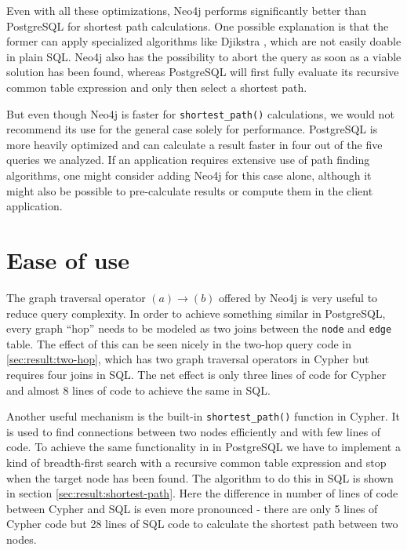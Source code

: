 \documentclass[11pt, a4paper,oneside,chapterprefix=false]{scrbook}
\begin{document}
Even with all these optimizations, Neo4j performs significantly better than PostgreSQL for shortest path calculations.
One possible explanation is that the former can apply specialized algorithms like Djikstra \cite{dijkstra}, which are not easily doable in plain SQL. Neo4j also has the possibility to abort the query as soon as a viable solution has been found, whereas PostgreSQL will first fully evaluate its recursive common table expression and only then select a shortest path.

But even though Neo4j is faster for \lstinline{shortest_path()} calculations, we would not recommend its use for the general case solely for performance. 
PostgreSQL is more heavily optimized and can calculate a result faster in four out of the five queries we analyzed. 
If an application requires extensive use of path finding algorithms, one might consider adding Neo4j for this case alone, although it might also be possible to pre-calculate results or compute them in the client application.

\section{Ease of use} \label{sec:convenience}

The graph traversal operator $(a) \rightarrow (b)$ offered by Neo4j is very useful to reduce query complexity.
In order to achieve something similar in PostgreSQL, every graph ``hop'' needs to be modeled as two joins between the \lstinline{node} and \lstinline{edge} table.
The effect of this can be seen nicely in the two-hop query code in \ref{sec:result:two-hop}, which has two graph traversal operators in Cypher but requires four joins in SQL. The net effect is only three lines of code for Cypher and almost 8 lines of code to achieve the same in SQL.

Another useful mechanism is the built-in \lstinline{shortest_path()} function in Cypher.
It is used to find connections between two nodes efficiently and with few lines of code.
To achieve the same functionality in in PostgreSQL we have to implement a kind of breadth-first search with a recursive common table expression and stop when the target node has been found.
The algorithm to do this in SQL is shown in section \ref{sec:result:shortest-path}.
Here the difference in number of lines of code between Cypher and SQL is even more pronounced - there are only 5 lines of Cypher code but 28 lines of SQL code to calculate the shortest path between two nodes.
\end{document}
